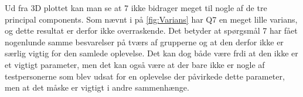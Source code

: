 Ud fra 3D plottet kan man se at 7 ikke bidrager meget til nogle af de tre principal components. Som nævnt i  på \autoref{fig:Varians} har Q7 en meget lille varians, og dette resultat er derfor ikke overraskende. Det betyder at spørgsmål 7 har fået nogenlunde samme besvarelser på tværs af grupperne og at den derfor ikke er særlig vigtig for den samlede oplevelse. Det kan dog både være frdi at den ikke er et vigtigt parameter, men det kan også være at der bare ikke er nogle af testpersonerne som blev udsat for en oplevelse der påvirkede dette parameter, men at det måske er vigtigt i andre sammenhænge.
